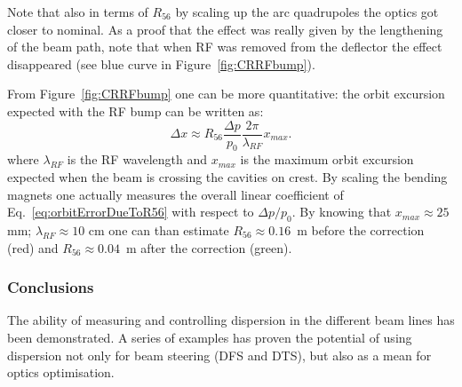 %
Note that also in terms of $R_{56}$ by scaling up the arc quadrupoles the optics got closer to nominal.
As a proof that the effect was really given by the lengthening of the beam path, 
note that when RF was removed from the deflector the effect disappeared (see blue curve in Figure~\ref{fig:CRRFbump}).

From Figure~\ref{fig:CRRFbump} one can be more quantitative: the orbit excursion expected with the RF bump can be written as:
\begin{equation}
\Delta x \approx R_{56} \frac{\Delta p}{p_0} \frac{2 \pi}{\lambda_{RF}} x_{max}.
\label{eq:orbitErrorDueToR56}
\end{equation}
%
where $\lambda_{RF}$ is the RF wavelength and $x_{max}$ is the maximum orbit excursion expected when 
the beam is crossing the cavities on crest. 
By scaling the bending magnets one actually measures the overall linear coefficient of 
Eq.~\ref{eq:orbitErrorDueToR56} with respect to 
$\Delta p/p_0$.
By knowing that $x_{max}\approx 25$ mm; $\lambda_{RF}\approx 10$ cm one can than estimate 
$R_{56} \approx 0.16$~m before the correction (red) and $R_{56} \approx 0.04$~m after the correction (green).



\subsubsection{Conclusions}
%
The ability of measuring and controlling dispersion in the different beam lines has been demonstrated.
A series of examples has proven the potential of using dispersion not only for beam steering (DFS and DTS),
but also as a mean for optics optimisation.


